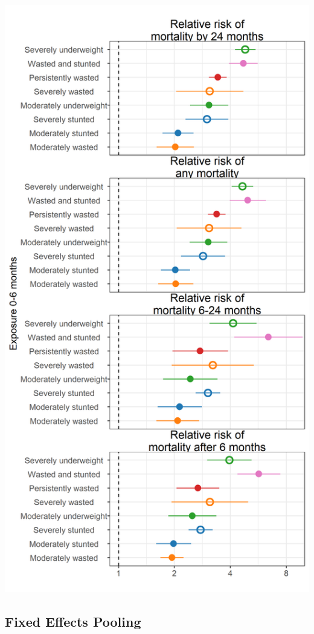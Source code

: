\documentclass[9pt,]{book}
\begin{document}
\includegraphics[width=21.67in]{figure-copies/fig-mort-RR-time-death}

\subsection{Fixed Effects Pooling}\label{fixed-effects-pooling}
\end{document}
